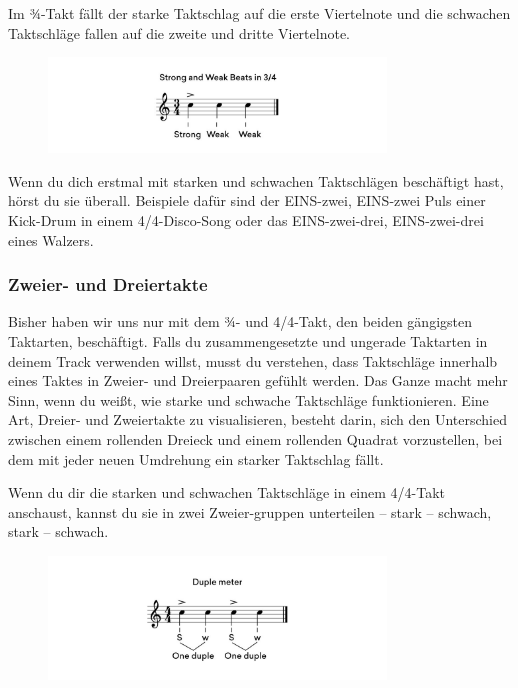 Im ¾-Takt fällt der starke Taktschlag auf die erste Viertelnote und die schwachen Taktschläge fallen auf die zweite und dritte Viertelnote.

\begin{figure}[H]
    \centering
    \includegraphics[width=0.8\textwidth]{images/Rythm_body_3}
\end{figure}

Wenn du dich erstmal mit starken und schwachen Taktschlägen beschäftigt hast, hörst du sie überall. Beispiele dafür sind der EINS-zwei, EINS-zwei Puls einer Kick-Drum in einem 4/4-Disco-Song oder das EINS-zwei-drei, EINS-zwei-drei eines Walzers.

\subsubsection{Zweier- und Dreiertakte}
Bisher haben wir uns nur mit dem ¾- und 4/4-Takt, den beiden gängigsten Taktarten, beschäftigt. Falls du zusammengesetzte und ungerade Taktarten in deinem Track verwenden willst, musst du verstehen, dass Taktschläge innerhalb eines Taktes in Zweier- und Dreierpaaren gefühlt werden. Das Ganze macht mehr Sinn, wenn du weißt, wie starke und schwache Taktschläge funktionieren. Eine Art, Dreier- und Zweiertakte zu visualisieren, besteht darin, sich den Unterschied zwischen einem rollenden Dreieck und einem rollenden Quadrat vorzustellen, bei dem mit jeder neuen Umdrehung ein starker Taktschlag fällt.

Wenn du dir die starken und schwachen Taktschläge in einem 4/4-Takt anschaust, kannst du sie in zwei Zweier-gruppen unterteilen – stark – schwach, stark – schwach.

\begin{figure}[H]
    \centering
    \includegraphics[width=0.8\textwidth]{images/Rythm_body_4}
\end{figure}

